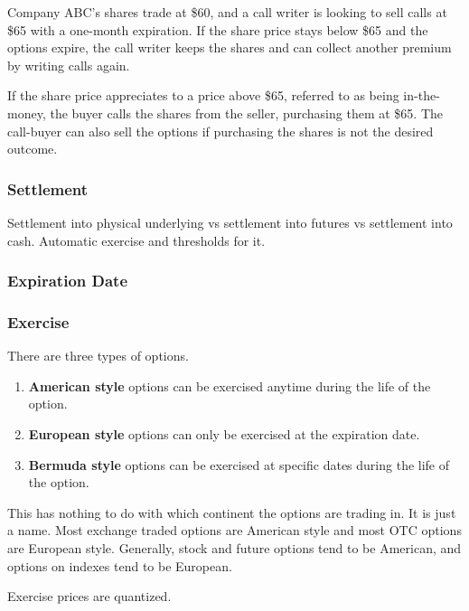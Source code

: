 \documentclass{article}
\begin{document}
      \begin{example}
        Company ABC's shares trade at \$60, and a call writer is looking to sell calls at \$65 with a one-month expiration. If the share price stays below \$65 and the options expire, the call writer keeps the shares and can collect another premium by writing calls again. 

        If the share price appreciates to a price above \$65, referred to as being in-the-money, the buyer calls the shares from the seller, purchasing them at \$65. The call-buyer can also sell the options if purchasing the shares is not the desired outcome.
      \end{example}

    \subsubsection{Settlement}

      Settlement into physical underlying vs settlement into futures vs settlement into cash. 
      Automatic exercise and thresholds for it. 

    \subsubsection{Expiration Date}

    \subsubsection{Exercise}

      There are three types of options. 
      \begin{enumerate}
        \item \textbf{American style} options can be exercised anytime during the life of the option. 
        \item \textbf{European style} options can only be exercised at the expiration date.
        \item \textbf{Bermuda style} options can be exercised at specific dates during the life of the option.
      \end{enumerate}
      This has nothing to do with which continent the options are trading in. It is just a name. Most exchange traded options are American style and most OTC options are European style. Generally, stock and future options tend to be American, and options on indexes tend to be European. 

      Exercise prices are quantized. 
\end{document}
